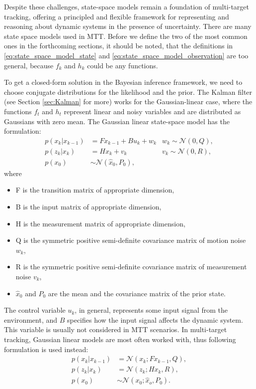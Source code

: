 Despite these challenges, state-space models remain a foundation of multi-target tracking, offering a principled and flexible framework for representing and reasoning about dynamic systems in the presence of uncertainty.
There are many state space models used in MTT. Before we define the two of the most common ones in the forthcoming sections, it
should be noted, that the definitions in \eqref{eq:state_space_model_state} and \eqref{eq:state_space_model_observation} are too general, because $f_k$ and $h_k$ could be any functions.

To get a closed-form solution in the Bayesian inference framework, we need
to choose conjugate distributions for the likelihood and the prior. The Kalman filter (see Section \ref{sec:Kalman} for
more) works for the Gaussian-linear case, where the functions
$f_t$ and $h_t$ represent linear and noisy variables and are distributed as Gaussians with zero mean. The Gaussian linear
state-space model has the formulation:
\begin{align}
    p(x_k|x_{k-1}) &= Fx_{k-1} + Bu_k + w_k
     &w_k \sim \mathcal{N}(0,Q),\\
    p(z_k|x_k) &= Hx_k + v_k
     &v_k \sim \mathcal{N}(0,R), \\
    p(x_0) &\sim \mathcal{N}(\hat{x}_0, P_0),
\end{align}
where
\begin{itemize}
    \item F is the transition matrix of appropriate dimension,
    \item B is the input matrix of appropriate dimension,
    \item H is the measurement matrix of appropriate dimension,
    \item Q is the symmetric positive semi-definite covariance matrix of
    motion noise $
    w_k$,
    \item R is the symmetric positive semi-definite covariance matrix of
    measurement
    noise $v_k$,
    \item $\hat{x}_0$ and $P_0$ are the mean and the covariance matrix of the prior state.
\end{itemize}
The control variable $u_k$, in general, represents some input signal from the environment, and
$B$ specifies how the input signal affects the dynamic system. This variable is usually not considered in MTT scenarios.
In multi-target tracking, Gaussian linear models are most often worked with, thus following formulation is used instead:
\begin{align}
    p(x_k|x_{k-1}) &= \mathcal{N}(x_k; Fx_{k-1}, Q),  \\
    p(z_k|x_k) &= \mathcal{N}(z_k;Hx_k,R), \\
    p(x_0) &\sim \mathcal{N}(x_0;\hat{x}_o, P_0).
\end{align}


